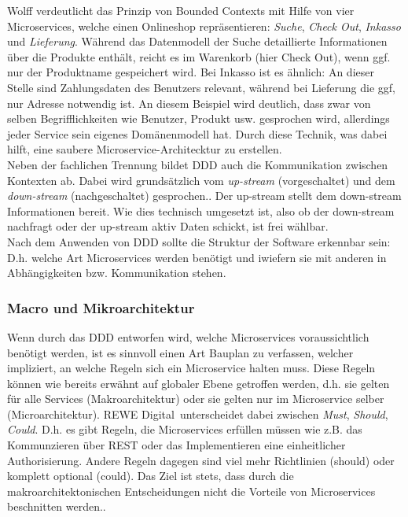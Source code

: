 Wolff verdeutlicht das Prinzip von Bounded Contexts mit Hilfe von vier Microservices, welche einen Onlineshop repräsentieren: \textit{Suche}, \textit{Check Out}, \textit{Inkasso} und \textit{Lieferung}. Während das Datenmodell der Suche detaillierte Informationen über die Produkte enthält, reicht es im Warenkorb (hier Check Out), wenn ggf. nur der Produktname gespeichert wird. Bei Inkasso ist es ähnlich: An dieser Stelle sind Zahlungsdaten des Benutzers relevant, während bei Lieferung die ggf, nur Adresse notwendig ist.\cite{wolff2018mic_praxis} An diesem Beispiel wird deutlich, dass zwar von selben Begrifflichkeiten wie Benutzer, Produkt usw. gesprochen wird, allerdings jeder Service sein eigenes Domänenmodell hat. Durch diese Technik, was dabei hilft, eine saubere Microservice-Architecktur zu erstellen.\cite{wolff2018mic_praxis} \cite{heise2016ddd} \\

Neben der fachlichen Trennung bildet DDD auch die Kommunikation zwischen Kontexten ab. Dabei wird grundsätzlich vom \textit{up-stream} (vorgeschaltet) und dem \textit{down-stream} (nachgeschaltet) gesprochen.\cite{wolff2018mic_praxis}. Der up-stream stellt dem down-stream Informationen bereit. Wie dies technisch umgesetzt ist, also ob der down-stream nachfragt oder der up-stream aktiv Daten schickt, ist frei wählbar. \\

Nach dem Anwenden von DDD sollte die Struktur der Software erkennbar sein: D.h. welche Art Microservices werden benötigt und iwiefern sie mit anderen in Abhängigkeiten bzw. Kommunikation stehen.   

\subsubsection{Macro und Mikroarchitektur}

Wenn durch das DDD entworfen wird, welche Microservices voraussichtlich benötigt werden, ist es sinnvoll einen Art Bauplan zu verfassen, welcher impliziert, an welche Regeln sich ein Microservice halten muss. Diese Regeln können wie bereits erwähnt auf globaler Ebene getroffen werden, d.h. sie gelten für alle Services (Makroarchitektur) oder sie gelten nur im Microservice selber (Microarchitektur). REWE Digital unterscheidet dabei zwischen \textit{Must}, \textit{Should}, \textit{Could}. D.h. es gibt Regeln, die Microservices erfüllen müssen wie z.B. das Kommunzieren über REST oder das Implementieren eine einheitlicher Authorisierung.\cite{rewe2019mic_ppp} Andere Regeln dagegen sind viel mehr Richtlinien (should) oder komplett optional (could). Das Ziel ist stets, dass durch die makroarchitektonischen Entscheidungen nicht die Vorteile von Microservices beschnitten werden.\cite{wolff2018mic_praxis}\cite{irakli2016mic_arc}. \\

